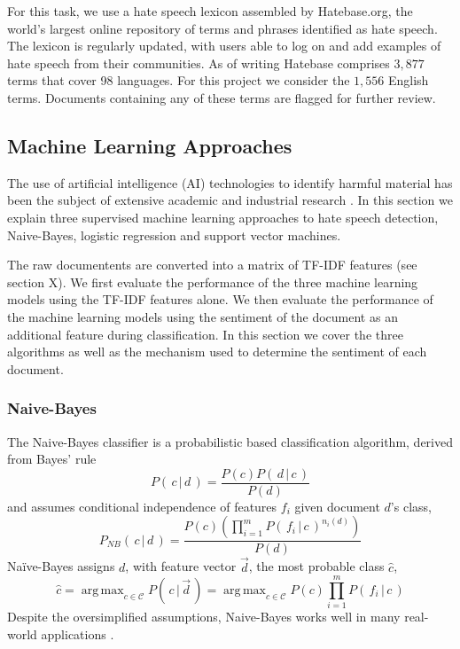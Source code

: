\documentclass[a4paper,12pt]{report}
\DeclareMathOperator*{\argmax}{arg\,max}
\begin{document}
For this task, we use a hate speech lexicon assembled by Hatebase.org, the world’s largest online repository of terms and phrases identified as hate speech. The lexicon is regularly updated, with users able to log on and add examples of hate speech from their communities. As of writing Hatebase comprises $3,877$ terms that cover 98 languages. For this project we consider the $1,556$ English terms. Documents containing any of these terms are flagged for further review.

\subsection{Machine Learning Approaches}
The use of artificial intelligence (AI) technologies to identify harmful material has been the subject of extensive academic and industrial research \cite{macavaney2019hate}. In this section we explain three supervised machine learning approaches to hate speech detection, Naive-Bayes, logistic regression and support vector machines. 

The raw documentents are converted into a matrix of TF-IDF features (see section X). We first evaluate the performance of the three machine learning models using the TF-IDF features alone. We then evaluate the performance of the machine learning models using the sentiment of the document as an additional feature during classification. In this section we cover the three algorithms as well as the mechanism used to determine the sentiment of each document. 

\subsubsection{Naive-Bayes}
The Naive-Bayes classifier is a probabilistic based classification algorithm, derived from Bayes’ rule
	\[P( \, c \, | \, d \,)=\frac{P(c)P(\, d \, | \, c \,)}{P(d)}\]
	and assumes conditional independence of features \(f_i\) given document \(d\)'s class,
	\[P_{NB}(\, c \, | \, d \,)= \frac{P(c)
		(\prod_{i=1}^{m}P(\, f_i \, | \, c \,)^{n_i(d)})}	%
	{P(d)}\]												%
	Naïve-Bayes assigns \(d\), with feature vector \(\vec{d}\), the most probable class \(\hat{c}\),	
 	\[ \hat{c} = \argmax_{c \in \mathcal{C}} P( \,c \, | \, \vec{d} \,)
 			   = \argmax_{c \in \mathcal{C}} P(c)\prod_{i=1}^{m} P( \, f_i \, | \, c \,)\]
 Despite the oversimplified assumptions, Naive-Bayes works well in many real-world applications \cite{rish2001empirical}. 
\end{document}
